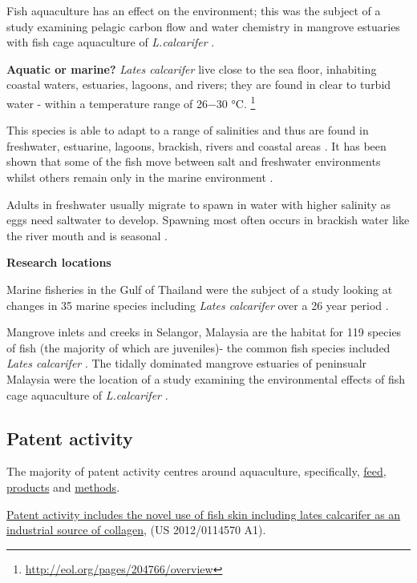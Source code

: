 \documentclass[]{book}
\theoremstyle{definition}
\theoremstyle{definition}
\theoremstyle{definition}
\theoremstyle{remark}
\begin{document}
Fish aquaculture has an effect on the environment; this was the subject
of a study examining pelagic carbon flow and water chemistry in mangrove
estuaries with fish cage aquaculture of \emph{L.calcarifer}
\citep{Alongi_2003}.

\textbf{Aquatic or marine?} \emph{Lates calcarifer} live close to the
sea floor, inhabiting coastal waters, estuaries, lagoons, and rivers;
they are found in clear to turbid water - within a temperature range of
26−30 °C. \footnote{\url{http://eol.org/pages/204766/overview}}

This species is able to adapt to a range of salinities and thus are
found in freshwater, estuarine, lagoons, brackish, rivers and coastal
areas \citep{Davis_1986}. It has been shown that some of the fish move
between salt and freshwater environments whilst others remain only in
the marine environment \citep{Davis_1986}.

Adults in freshwater usually migrate to spawn in water with higher
salinity as eggs need saltwater to develop. Spawning most often occurs
in brackish water like the river mouth and is seasonal
\citep{Moore_1982}.

\textbf{Research locations}

Marine fisheries in the Gulf of Thailand were the subject of a study
looking at changes in 35 marine species including \emph{Lates
calcarifer} over a 26 year period \citep{Tuantong_2015}.

Mangrove inlets and creeks in Selangor, Malaysia are the habitat for 119
species of fish (the majority of which are juveniles)- the common fish
species included \emph{Lates calcarifer} \citep{Sasekumar_1992}. The
tidally dominated mangrove estuaries of peninsualr Malaysia were the
location of a study examining the environmental effects of fish cage
aquaculture of \emph{L.calcarifer} \citep{Alongi_2003}.

\hypertarget{patent-activity-1}{%
\subsection{Patent activity}\label{patent-activity-1}}

The majority of patent activity centres around aquaculture,
specifically, \href{WO\%202008/084074\%20A2}{feed},
\href{WO\%202010/027788\%20A1}{products} and
\href{WO\%202009/063044\%20A1}{methods}.

\href{US\%202012/0114570\%20A1}{Patent activity includes the novel use
of fish skin including lates calcarifer as an industrial source of
collagen}, (US 2012/0114570 A1).
\end{document}
